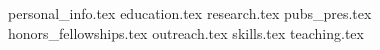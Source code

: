 \documentclass[a4paper,10pt]{article}
\begin{document}
\thispagestyle{first}
\par{\bigskip\par}

{personal_info.tex}
{education.tex}
{research.tex}
{pubs_pres.tex}
{honors_fellowships.tex}
{outreach.tex}
{skills.tex}
{teaching.tex}
\end{document}
